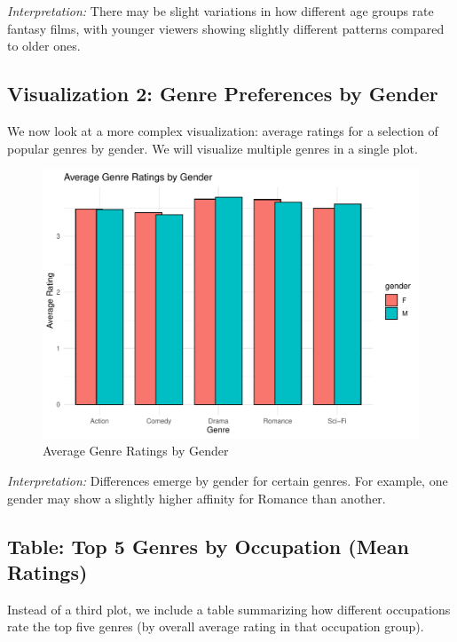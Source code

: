 \documentclass[
  man]{apa6}
\begin{document}
\emph{Interpretation:} There may be slight variations in how different age groups rate fantasy films, with younger viewers showing slightly different patterns compared to older ones.

\subsection{Visualization 2: Genre Preferences by Gender}\label{visualization-2-genre-preferences-by-gender}

We now look at a more complex visualization: average ratings for a selection of popular genres by gender. We will visualize multiple genres in a single plot.

\begin{figure}
\centering
\includegraphics{Project_files/figure-latex/genre-gender-plot-1.pdf}
\caption{\label{fig:genre-gender-plot}Average Genre Ratings by Gender}
\end{figure}

\emph{Interpretation:} Differences emerge by gender for certain genres. For example, one gender may show a slightly higher affinity for Romance than another.

\subsection{Table: Top 5 Genres by Occupation (Mean Ratings)}\label{table-top-5-genres-by-occupation-mean-ratings}

Instead of a third plot, we include a table summarizing how different occupations rate the top five genres (by overall average rating in that occupation group).
\end{document}
